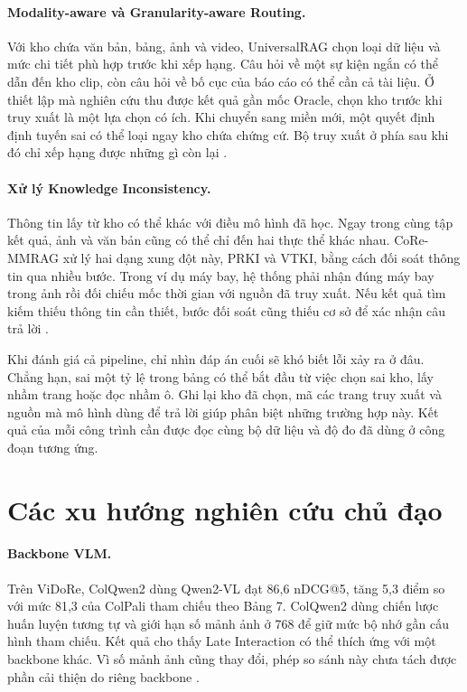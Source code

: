 \paragraph{Modality-aware và Granularity-aware Routing.}
Với kho chứa văn bản, bảng, ảnh và video, UniversalRAG chọn loại dữ liệu
và mức chi tiết phù hợp trước khi xếp hạng. Câu hỏi về một sự kiện ngắn
có thể dẫn đến kho clip, còn câu hỏi về bố cục của báo cáo có thể cần cả
tài liệu. Ở thiết lập mà nghiên cứu thu được kết quả gần mốc Oracle, chọn
kho trước khi truy xuất là một lựa chọn có ích. Khi chuyển sang miền
mới, một quyết định định tuyến sai có thể loại ngay kho chứa chứng cứ.
Bộ truy xuất ở phía sau khi đó chỉ xếp hạng được những gì còn lại
\cite{yeo2026universalrag}.

\paragraph{Xử lý Knowledge Inconsistency.}
Thông tin lấy từ kho có thể khác với điều mô hình đã học. Ngay trong
cùng tập kết quả, ảnh và văn bản cũng có thể chỉ đến hai thực thể khác
nhau. CoRe-MMRAG xử lý hai dạng xung đột này, PRKI và VTKI, bằng cách
đối soát thông tin qua nhiều bước. Trong ví dụ máy bay, hệ thống phải
nhận đúng máy bay trong ảnh rồi đối chiếu mốc thời gian với nguồn đã
truy xuất. Nếu kết quả tìm kiếm thiếu thông tin cần thiết, bước đối soát
cũng thiếu cơ sở để xác nhận câu trả lời \cite{tian2025coremmrag}.

Khi đánh giá cả pipeline, chỉ nhìn đáp án cuối sẽ khó biết lỗi xảy ra ở đâu. Chẳng hạn, sai một tỷ lệ trong bảng có thể bắt đầu từ việc chọn sai kho, lấy nhầm trang hoặc đọc nhầm ô. Ghi lại kho đã chọn, mã các trang truy xuất và nguồn mà mô hình dùng để trả lời giúp phân biệt những trường hợp này. Kết quả của mỗi công trình cần được đọc cùng bộ dữ liệu và độ đo đã dùng ở công đoạn tương ứng.

\section{Các xu hướng nghiên cứu chủ đạo}
\label{sec:conc_trends}

\paragraph{Backbone VLM.}
Trên ViDoRe, ColQwen2 dùng Qwen2-VL đạt 86,6 nDCG@5, tăng 5,3 điểm so
với mức 81,3 của ColPali tham chiếu theo Bảng 7. ColQwen2 dùng chiến
lược huấn luyện tương tự và giới hạn số mảnh ảnh ở 768 để giữ mức bộ nhớ
gần cấu hình tham chiếu. Kết quả cho thấy Late Interaction có thể thích
ứng với một backbone khác. Vì số mảnh ảnh cũng thay đổi, phép so sánh này
chưa tách được phần cải thiện do riêng backbone \cite{faysse2025colpali}.

